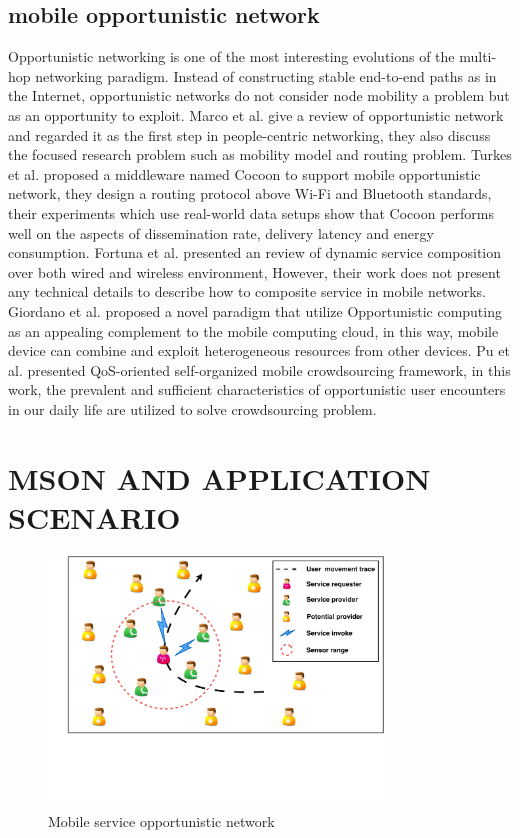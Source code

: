 \documentclass[10pt,journal,compsoc]{IEEEtran}
\begin{document}
\subsection{mobile opportunistic network}
Opportunistic networking is one of the most interesting evolutions of the multi-hop networking paradigm. Instead of constructing stable end-to-end paths as in the Internet, opportunistic networks do not consider node mobility a problem but as an opportunity to exploit. 
Marco et al. \cite{Conti2014} give a review of opportunistic network and regarded it as the first step in people-centric networking, they also discuss the focused research problem such as mobility model and routing problem.
Turkes et al. \cite{turkes2016cocoon} proposed a middleware named Cocoon to support mobile opportunistic network, they design a routing protocol above Wi-Fi and Bluetooth standards, their experiments which use real-world data setups show that Cocoon performs well on the aspects of dissemination rate, delivery latency and energy consumption.
Fortuna et al. \cite{fortuna2009dynamic} presented an review of dynamic service composition over both wired and wireless environment, However, their work does not present any technical details to describe how to composite service in mobile networks.
Giordano et al. \cite{giordano2011human} proposed a novel paradigm that utilize Opportunistic computing as an appealing complement to the mobile computing cloud, in this way, mobile device can combine and exploit heterogeneous resources from other devices.
Pu et al. \cite{Pu2017crowd} presented QoS-oriented self-organized mobile crowdsourcing framework, in this work, the prevalent and sufficient characteristics of opportunistic user encounters in our daily life are utilized to solve crowdsourcing problem.


\section{MSON AND APPLICATION SCENARIO}

\begin{figure}[!t]
\centering
\includegraphics[width=3.5in]{./img/pic2.pdf}
\caption{Mobile service opportunistic network}
\label{fig_mson}
\end{figure}
\end{document}

